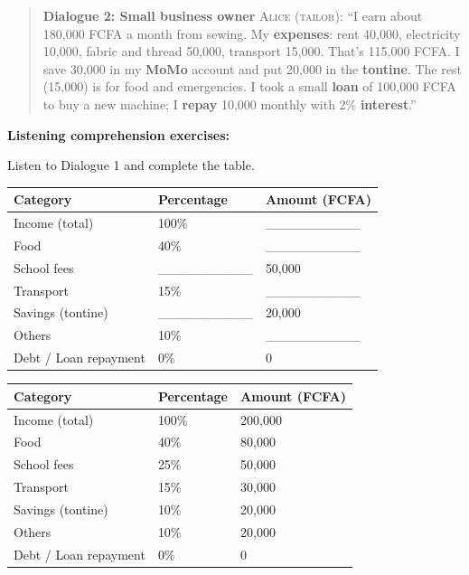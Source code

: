 \documentclass[11pt]{article}
\begin{document}
\begin{quote}
\textbf{Dialogue 2: Small business owner}
\textsc{Alice (tailor)}: ``I earn about 180,000 FCFA a month from sewing. My \textbf{expenses}: rent 40,000, electricity 10,000, fabric and thread 50,000, transport 15,000. That's 115,000 FCFA. I save 30,000 in my \textbf{MoMo} account and put 20,000 in the \textbf{tontine}. The rest (15,000) is for food and emergencies. I took a small \textbf{loan} of 100,000 FCFA to buy a new machine; I \textbf{repay} 10,000 monthly with 2\% \textbf{interest}.''
\end{quote}

\textbf{Listening comprehension exercises:}

\begin{exercice}
Listen to Dialogue 1 and complete the table.
\begin{center}
\begin{tabularx}{\linewidth}{|l|X|X|}\hline
\textbf{Category} & \textbf{Percentage} & \textbf{Amount (FCFA)} \\ \hline
Income (total) & 100\% & \_\_\_\_\_\_\_\_\_\_ \\ \hline
Food & 40\% & \_\_\_\_\_\_\_\_\_\_ \\ \hline
School fees & \_\_\_\_\_\_\_\_\_\_ & 50,000 \\ \hline
Transport & 15\% & \_\_\_\_\_\_\_\_\_\_ \\ \hline
Savings (tontine) & \_\_\_\_\_\_\_\_\_\_ & 20,000 \\ \hline
Others & 10\% & \_\_\_\_\_\_\_\_\_\_ \\ \hline
Debt / Loan repayment & 0\% & 0 \\ \hline
\end{tabularx}
\end{center}
\end{exercice}

\begin{corrige}[Exercice 1]
\begin{center}
\begin{tabularx}{\linewidth}{|l|X|X|}\hline
\textbf{Category} & \textbf{Percentage} & \textbf{Amount (FCFA)} \\ \hline
Income (total) & 100\% & 200,000 \\ \hline
Food & 40\% & 80,000 \\ \hline
School fees & 25\% & 50,000 \\ \hline
Transport & 15\% & 30,000 \\ \hline
Savings (tontine) & 10\% & 20,000 \\ \hline
Others & 10\% & 20,000 \\ \hline
Debt / Loan repayment & 0\% & 0 \\ \hline
\end{tabularx}
\end{center}
\end{corrige}
\end{document}
